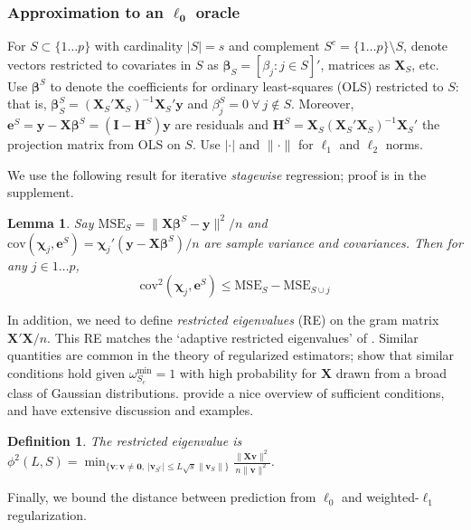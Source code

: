 \documentclass[12pt]{article}
\newtheorem{definition}{\sc Definition}[section]
\newtheorem{lemma}{\sc Lemma}[section]
\newcommand{\bs}[1]{\boldsymbol{#1}}
\newcommand{\mr}[1]{\mathrm{#1}}
\newcommand{\bm}[1]{\mathbf{#1}}
\begin{document}
\subsubsection{Approximation to an $\bs{\ell_0}$ oracle}

 For  $S \subset \{1\ldots p\}$ with cardinality $|S|=s$ and complement $S^c =
\{1\ldots p\}\setminus S$, denote vectors restricted to covariates in $S$ as
$\bm{\beta}_S = [\beta_j:j\in S]'$, matrices as $\bm{X}_S$, etc.  Use
$\bs{\beta}^S$ to denote the coefficients for ordinary least-squares (OLS)
restricted to $S$: that is, $\bs{\beta}^S_S =
(\bm{X}_S'\bm{X}_S)^{-1}\bm{X}_S'\bm{y}$ and $\beta^{S}_j = 0~\forall~j\notin
S$.  Moreover, $\bm{e}^S = \bm{y}-\bm{X}\bs{\beta}^S =
(\bm{I}-\bm{H}^S)\bm{y}$ are residuals and $\bm{H}^S =
\bm{X}_S(\bm{X}_S'\bm{X}_S)^{-1}\bm{X}_S'$ the projection matrix from OLS on $S$.  
Use $|\cdot|$ and $\|\cdot\|$ for $\ell_1$ and $\ell_2$ norms.

We use the following result for iterative \textit{stagewise} regression; proof is in the supplement. 
\begin{lemma}\label{SSElemma}
Say $\mr{MSE}_S = \|\bm{X}\bs{\beta}^S-\bm{y}\|^2/n$ and 
$\mr{cov}(\bs{\chi}_j,\bm{e}^S) = \bs{\chi}_j'(\bm{y}-\bm{X}\bs{\beta}^S)/n$ are sample variance and covariances.  Then for any $j \in 1\ldots p$, 
\[
\mr{cov}^2(\bs{\chi}_j,\bm{e}^S) \leq \mr{MSE}_S - \mr{MSE}_{S\cup j}
\]
\end{lemma}

In addition, we need to define {\it restricted eigenvalues} (RE) on the gram matrix $\bm{X}'\bm{X}/n$.
  This  RE  matches the `adaptive restricted eigenvalues' of \cite{buhlmann_statistics_2011}.  
Similar quantities are common in the theory of regularized estimators; \cite{raskutti_restricted_2010} show that similar conditions hold given  $\omega^{\mr{min}}_{S_c}=1$ with high probability for $\bm{X}$ drawn from a broad class of Gaussian distributions.  \cite{bickel_simultaneous_2009} provide a nice overview of sufficient conditions, and \cite{buhlmann_statistics_2011} have extensive discussion and examples.  
\begin{definition}\label{redef}
The restricted eigenvalue is
$
\phi^2(L,S) = \min_{\{\bm{v}: \bm{v}\neq \bm{0},~|\bm{v}_{S^c}| \leq L\sqrt{s}\|\bm{v}_S\|\}}\frac{\|\bm{X}\bm{v}\|^2}{n\|\bm{v}\|^2}$.
\end{definition}

\noindent Finally,  we bound the distance between prediction
from $\ell_0$ and weighted-$\ell_1$ regularization.  
\end{document}
